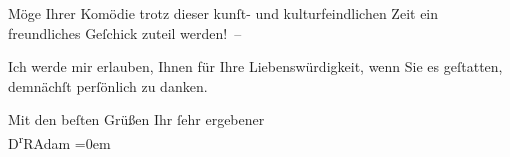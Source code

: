 \pstart
           Möge Ihrer Komödie trotz
               dieser kunſt- und kulturfeindlichen Zeit ein freundliches Geſchick zuteil
               werden! –\pend
           
\pstart
           Ich werde mir erlauben, Ihnen für Ihre Liebenswürdigkeit, wenn Sie es geſtatten,
               demnächſt perſönlich zu danken.\pend
           
\pstart
           Mit den beſten Grüßen Ihr{ }ſehr ergebener{\\[\baselineskip]}\spacefill\mbox{D\textsuperscript{r}RAdam}\pend
           \leftskip=0em{}\endnumbering{}  \newcommand{\dateiname}{L02220}\newcommand{\titel}{Robert Adam an Arthur Schnitzler, 21. 10. 1915}\newcommand{\editorInnen}{Martin Anton Müller und Gerd-Hermann Susen}
